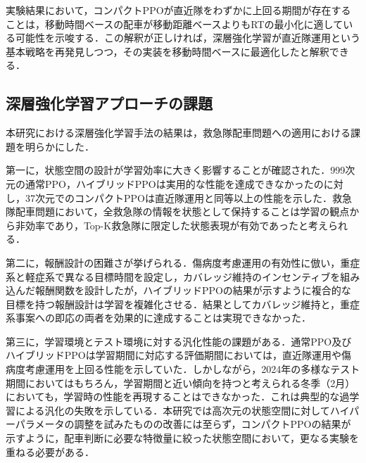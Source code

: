 実験結果において，コンパクトPPOが直近隊をわずかに上回る期間が存在することは，移動時間ベースの配車が移動距離ベースよりもRTの最小化に適している可能性を示唆する．この解釈が正しければ，深層強化学習が直近隊運用という基本戦略を再発見しつつ，その実装を移動時間ベースに最適化したと解釈できる．

\subsection{深層強化学習アプローチの課題}
本研究における深層強化学習手法の結果は，救急隊配車問題への適用における課題を明らかにした．

第一に，状態空間の設計が学習効率に大きく影響することが確認された．999次元の通常PPO，ハイブリッドPPOは実用的な性能を達成できなかったのに対し，37次元でのコンパクトPPOは直近隊運用と同等以上の性能を示した．救急隊配車問題において，全救急隊の情報を状態として保持することは学習の観点から非効率であり，Top-K救急隊に限定した状態表現が有効であったと考えられる．

第二に，報酬設計の困難さが挙げられる．傷病度考慮運用の有効性に倣い，重症系と軽症系で異なる目標時間を設定し，カバレッジ維持のインセンティブを組み込んだ報酬関数を設計したが，ハイブリッドPPOの結果が示すように複合的な目標を持つ報酬設計は学習を複雑化させる．結果としてカバレッジ維持と，重症系事案への即応の両者を効果的に達成することは実現できなかった．

第三に，学習環境とテスト環境に対する汎化性能の課題がある．通常PPO及びハイブリッドPPOは学習期間に対応する評価期間においては，直近隊運用や傷病度考慮運用を上回る性能を示していた．しかしながら，2024年の多様なテスト期間においてはもちろん，学習期間と近い傾向を持つと考えられる冬季（2月）においても，学習時の性能を再現することはできなかった．これは典型的な過学習による汎化の失敗を示している．本研究では高次元の状態空間に対してハイパーパラメータの調整を試みたものの改善には至らず，コンパクトPPOの結果が示すように，配車判断に必要な特徴量に絞った状態空間において，更なる実験を重ねる必要がある．

\FloatBarrier 
